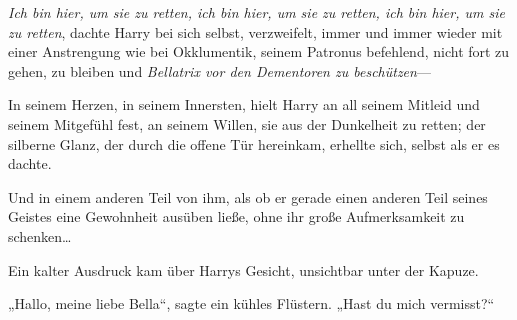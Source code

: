 \emph{Ich bin hier, um sie zu retten, ich bin hier, um sie zu retten, ich bin hier, um sie zu retten}, dachte Harry bei sich selbst, verzweifelt, immer und immer wieder mit einer Anstrengung wie bei Okklumentik, seinem Patronus befehlend, nicht fort zu gehen, zu bleiben und \emph{Bellatrix vor den Dementoren zu beschützen}—

In seinem Herzen, in seinem Innersten, hielt Harry an all seinem Mitleid und seinem Mitgefühl fest, an seinem Willen, sie aus der Dunkelheit zu retten; der silberne Glanz, der durch die offene Tür hereinkam, erhellte sich, selbst als er es dachte.

Und in einem anderen Teil von ihm, als ob er gerade einen anderen Teil seines Geistes eine Gewohnheit ausüben ließe, ohne ihr große Aufmerksamkeit zu schenken…

Ein kalter Ausdruck kam über Harrys Gesicht, unsichtbar unter der Kapuze.

„Hallo, meine liebe Bella“, sagte ein kühles Flüstern. „Hast du mich vermisst?“

